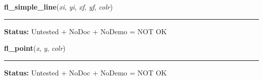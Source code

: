     \label{xformslib:library:fl_line}

    \vspace{0.5ex}

\hspace{.8\funcindent}\begin{boxedminipage}{\funcwidth}

    \raggedright \textbf{fl\_simple\_line}(\textit{xi}, \textit{yi}, \textit{xf}, \textit{yf}, \textit{colr})

    \vspace{-1.5ex}

    \rule{\textwidth}{0.5\fboxrule}
\setlength{\parskip}{2ex}
\setlength{\parskip}{1ex}
\textbf{Status:} Untested + NoDoc + NoDemo = NOT OK



    \end{boxedminipage}

    \label{xformslib:library:fl_point}

    \vspace{0.5ex}

\hspace{.8\funcindent}\begin{boxedminipage}{\funcwidth}

    \raggedright \textbf{fl\_point}(\textit{x}, \textit{y}, \textit{colr})

    \vspace{-1.5ex}

    \rule{\textwidth}{0.5\fboxrule}
\setlength{\parskip}{2ex}
\setlength{\parskip}{1ex}
\textbf{Status:} Untested + NoDoc + NoDemo = NOT OK



    \end{boxedminipage}

    \label{xformslib:library:fl_points}

    \vspace{0.5ex}

